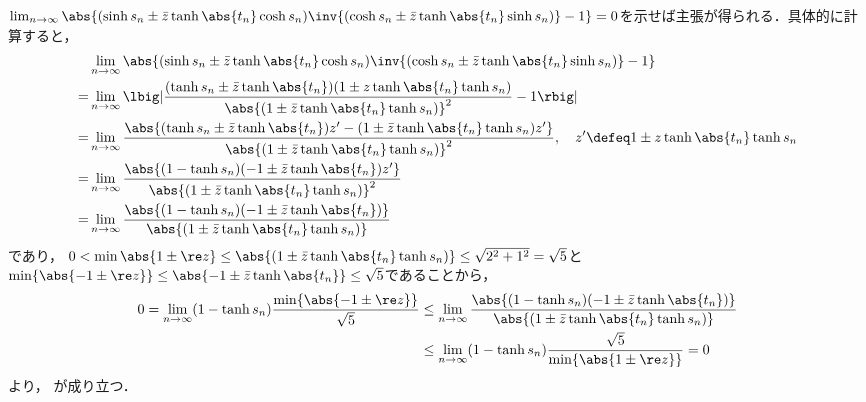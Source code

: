 \begin{calcof}{}
  
  $\lim_{n\to \infty}\abs{(\sinh s_n \pm \bar{z} \tanh \abs{t_n} \cosh s_n)\inv{(\cosh s_n \pm \bar{z} \tanh \abs{t_n} \sinh s_n) } - 1} = 0$を示せば主張が得られる．具体的に計算すると，
  \begin{align*}
    &\lim_{n\to \infty}\abs{(\sinh s_n \pm \bar{z} \tanh \abs{t_n} \cosh s_n)\inv{(\cosh s_n \pm \bar{z} \tanh \abs{t_n} \sinh s_n) } - 1}\\
    = & \lim_{n\to \infty}\lbig|\frac{(\tanh s_n\pm \bar{z}\tanh \abs{t_n})(1 \pm z \tanh\abs{t_n}\tanh s_n )}{\abs{(1 \pm \bar{z} \tanh\abs{t_n}\tanh s_n )}^2} - 1 \rbig|\\    
    = & \lim_{n\to \infty}\frac{\abs{(\tanh s_n\pm \bar{z}\tanh \abs{t_n})z' - (1 \pm \bar{z} \tanh\abs{t_n}\tanh s_n )z' }}{\abs{(1 \pm \bar{z} \tanh\abs{t_n}\tanh s_n )}^2}, \quad z'\defeq 1 \pm z\tanh\abs{t_n}\tanh s_n \\
    = & \lim_{n\to \infty}\frac{\abs{(1-\tanh s_n)(-1\pm \bar{z}\tanh \abs{t_n} )z'}}{\abs{(1 \pm \bar{z} \tanh\abs{t_n}\tanh s_n )}^2} \\
    = & \lim_{n\to \infty}\frac{\abs{(1-\tanh s_n)(-1\pm \bar{z}\tanh \abs{t_n} )}}{\abs{(1 \pm \bar{z} \tanh\abs{t_n}\tanh s_n )}} 
  \end{align*}
  であり，
  $0 < \min{\abs{1\pm \re z}}\leq  \abs{(1 \pm \bar{z} \tanh\abs{t_n}\tanh s_n )}\leq \sqrt{2^2 + 1^2} = \sqrt{5} $と$\min\{\abs{-1\pm \re z } \}  \leq \abs{-1\pm\bar{z}\tanh \abs{t_n} } \leq \sqrt{5} $であることから，
    \begin{align*}
      0 = \lim_{n\to \infty}(1-\tanh s_n)\frac{\min\{\abs{-1\pm \re z} \}}{\sqrt{5}}  &\leq \lim_{n\to \infty}\frac{\abs{(1-\tanh s_n)(-1\pm \bar{z}\tanh \abs{t_n} )}}{\abs{(1 \pm \bar{z} \tanh\abs{t_n}\tanh s_n )}}\\
      &\leq \lim_{n\to \infty}(1-\tanh s_n)\frac{\sqrt{5}}{\min\{\abs{1\pm \re z} \}} = 0
    \end{align*}
    より， が成り立つ．

\end{calcof}



